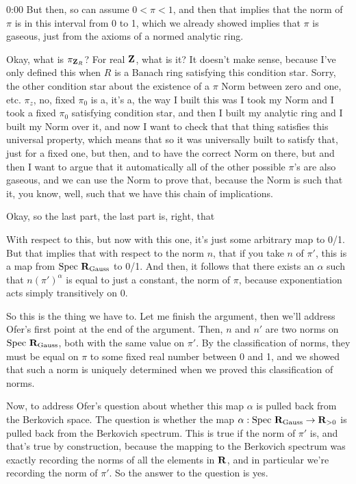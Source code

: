 \begin{unfinished}{0:00}
But then, so can assume $0 < \pi < 1$, and then that implies that the norm of $\pi$ is in this interval from 0 to 1, which we already showed implies that $\pi$ is gaseous, just from the axioms of a normed analytic ring.

Okay, what is $\pi_{\mathbf Z_R}$? For real $\mathbf Z$, what is it? It doesn't make sense, because I've only defined this when $R$ is a Banach ring satisfying this condition star. Sorry, the other condition star about the existence of a $\pi$ Norm between zero and one, etc. $\pi_z$, no, fixed $\pi_0$ is a, it's a, the way I built this was I took my Norm and I took a fixed $\pi_0$ satisfying condition star, and then I built my analytic ring and I built my Norm over it, and now I want to check that that thing satisfies this universal property, which means that so it was universally built to satisfy that, just for a fixed one, but then, and to have the correct Norm on there, but and then I want to argue that it automatically all of the other possible $\pi$'s are also gaseous, and we can use the Norm to prove that, because the Norm is such that it, you know, well, such that we have this chain of implications.

Okay, so the last part, the last part is, right, that

With respect to this, but now with this one, it's just some arbitrary map to 0/1. But that implies that with respect to the norm $n$, that if you take $n$ of $\pi'$, this is a map from $\mathrm{Spec}\ \R_{\text{Gauss}}$ to 0/1. And then, it follows that there exists an $\alpha$ such that $n(\pi')^{\alpha}$ is equal to just a constant, the norm of $\pi$, because exponentiation acts simply transitively on 0.

So this is the thing we have to. Let me finish the argument, then we'll address Ofer's first point at the end of the argument. Then, $n$ and $n'$ are two norms on $\mathrm{Spec}\ \R_{\text{Gauss}}$, both with the same value on $\pi'$. By the classification of norms, they must be equal on $\pi$ to some fixed real number between 0 and 1, and we showed that such a norm is uniquely determined when we proved this classification of norms.

Now, to address Ofer's question about whether this map $\alpha$ is pulled back from the Berkovich space. The question is whether the map $\alpha: \mathrm{Spec}\ \mathbf R_{\text{Gauss}} \to \mathbf R_{>0}$ is pulled back from the Berkovich spectrum. This is true if the norm of $\pi'$ is, and that's true by construction, because the mapping to the Berkovich spectrum was exactly recording the norms of all the elements in $\mathbf R$, and in particular we're recording the norm of $\pi'$. So the answer to the question is yes.


\end{unfinished}
